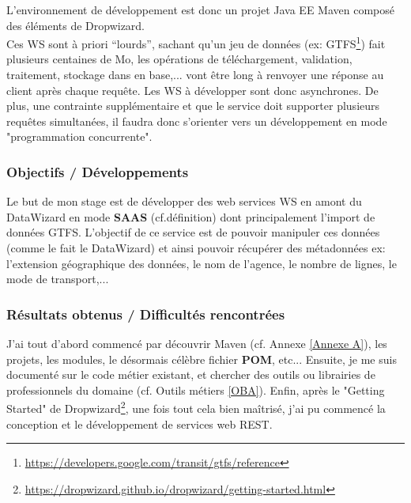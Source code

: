 L'environnement de développement est donc un projet Java EE Maven composé des éléments de Dropwizard. \\
Ces WS sont à priori “lourds”, sachant qu'un jeu de données (ex: GTFS\footnote{\url{https://developers.google.com/transit/gtfs/reference}}) fait plusieurs centaines de Mo, les opérations de téléchargement, validation, traitement, stockage dans en base,... vont être long à renvoyer une réponse au client après chaque requête. Les WS à développer sont donc asynchrones. De plus, une contrainte supplémentaire et que le service doit supporter plusieurs requêtes simultanées, il faudra donc s'orienter vers un développement en mode "programmation concurrente".\\

\subsubsection{Objectifs / Développements}

Le but de mon stage est de développer des web services WS en amont du DataWizard en mode \textbf{SAAS} (cf.définition) dont principalement l'import de données GTFS. L'objectif de ce service est de pouvoir manipuler ces données (comme le fait le DataWizard) et ainsi pouvoir récupérer des métadonnées ex: l'extension géographique des données, le nom de l'agence, le nombre de lignes, le mode de transport,...\\




\subsubsection{Résultats obtenus / Difficultés rencontrées}

J'ai tout d'abord commencé par découvrir Maven (cf. Annexe \ref{Annexe A}), les projets, les modules, le désormais célèbre fichier \textbf{POM}, etc...
Ensuite, je me suis documenté sur le code métier existant, et chercher des outils ou librairies de professionnels du domaine (cf. Outils métiers \ref{OBA}).
Enfin, après le "Getting Started" de Dropwizard\footnote{\url{https://dropwizard.github.io/dropwizard/getting-started.html}}, une fois tout cela bien maîtrisé, j'ai pu  commencé la conception et le développement de services web REST.\\

